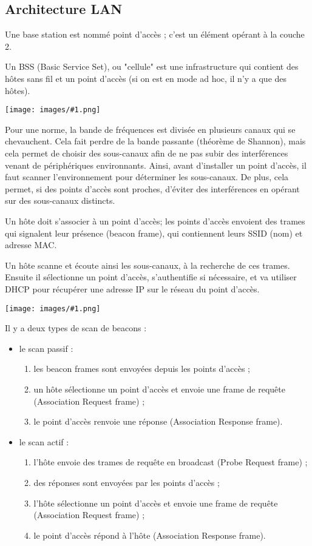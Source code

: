 \documentclass[10pt,a4paper]{report}
\newcommand{\dessin}[1]{\begin{center}\texttt{[image: images/\#1.png]}\end{center}}
\newcommand{\dessinS}[2]{\begin{center}\texttt{[image: images/\#1.png]}\end{center}}
\begin{document}
		\subsection{Architecture LAN}
		
		Une base station est nommé point d'accès ; c'est un élément opérant à la couche 2.
		
		Un BSS (Basic Service Set), ou "cellule" est une infrastructure qui contient des hôtes sans fil et un point d'accès (si on est en mode ad hoc, il n'y a que des hôtes).
	
		\dessin{34}
	
		Pour une norme, la bande de fréquences est divisée en plusieurs canaux qui se chevauchent. Cela fait perdre de la bande passante (théorème de Shannon), mais cela permet de choisir des sous-canaux afin de ne pas subir des interférences venant de périphériques environnants. Ainsi, avant d'installer un point d'accès, il faut scanner l'environnement pour déterminer les sous-canaux. De plus, cela permet, si des points d'accès sont proches, d'éviter des interférences en opérant sur des sous-canaux distincts.
		
		Un hôte doit s'associer à un point d'accès; les points d'accès envoient des trames qui signalent leur présence (beacon frame), qui contiennent leurs SSID (nom) et adresse MAC. 
		
		Un hôte scanne et écoute ainsi les sous-canaux, à la recherche de ces trames. Ensuite il sélectionne un point d'accès, s'authentifie si nécessaire, et va utiliser DHCP pour récupérer une adresse IP sur le réseau du point d'accès.
	
	
		\dessinS{35}{.8}
		Il y a deux types de scan de beacons :
	
		\begin{itemize}
			\item le scan passif :
			
			\begin{enumerate}
				\item les beacon frames sont envoyées depuis les points d'accès ;
				\item un hôte sélectionne un point d'accès et envoie une frame de requête (Association Request frame) ;
				\item le point d'accès renvoie une réponse (Association Response frame).
			\end{enumerate}
			
			\item le scan actif :
			
			\begin{enumerate}
				\item l'hôte envoie des trames de requête en broadcast (Probe Request frame) ;
				\item des réponses sont envoyées par les points d'accès ;
				\item l'hôte sélectionne un point d'accès et envoie une frame de requête (Association Request frame) ;
				\item le point d'accès répond à l'hôte (Association Response frame).
			\end{enumerate}
		\end{itemize}		
	
\end{document}
